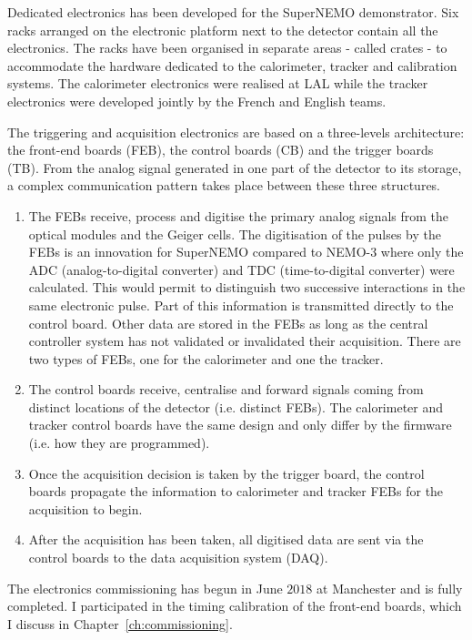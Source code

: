 Dedicated electronics has been developed for the SuperNEMO demonstrator.
Six racks arranged on the electronic platform next to the detector contain all the electronics.
The racks have been organised in separate areas - called crates - to accommodate the hardware dedicated to the calorimeter, tracker and calibration systems.
The calorimeter electronics were realised at LAL while the tracker electronics were developed jointly by the French and English teams.

The triggering and acquisition electronics are based on a three-levels architecture: the front-end boards (FEB), the control boards (CB) and the trigger boards (TB).
From the analog signal generated in one part of the detector to its storage, a complex communication pattern takes place between these three structures.
\begin{enumerate}
\item The FEBs receive, process and digitise the primary analog signals from the optical modules and the Geiger cells.
  The digitisation of the pulses by the FEBs is an innovation for SuperNEMO compared to NEMO-$3$ where only the ADC (analog-to-digital converter) and TDC (time-to-digital converter) were calculated.
  This would permit to distinguish two successive interactions in the same electronic pulse.
  Part of this information is transmitted directly to the control board.
  Other data are stored in the FEBs as long as the central controller system has not validated or invalidated their acquisition.
  There are two types of FEBs, one for the calorimeter and one the tracker.
\item The control boards receive, centralise and forward signals coming from distinct locations of the detector (i.e. distinct FEBs).
  The calorimeter and tracker control boards have the same design and only differ by the firmware (i.e. how they are programmed).
\item Once the acquisition decision is taken by the trigger board, the control boards propagate the information to calorimeter and tracker FEBs for the acquisition to begin.
\item After the acquisition has been taken, all digitised data are sent via the control boards to the data acquisition system (DAQ).
\end{enumerate}
The electronics commissioning has begun in June $2018$ at Manchester and is fully completed.
I participated in the timing calibration of the front-end boards, which I discuss in Chapter~\ref{ch:commissioning}.

